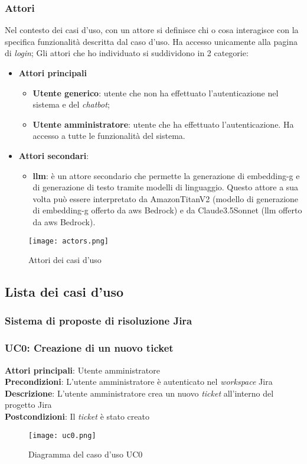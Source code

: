 \subsubsection{Attori}
Nel contesto dei casi d'uso, con un attore si definisce chi o cosa interagisce con la specifica funzionalità descritta dal caso d'uso. Ha accesso unicamente alla pagina di \textit{login}; 
Gli attori che ho individuato si suddividono in 2 categorie:
\begin{itemize}
    \item \textbf{Attori principali} \begin{itemize} \item \textbf{Utente generico}: utente che non ha effettuato l'autenticazione nel sistema e del \textit{chatbot}; \item \textbf{Utente amministratore}: utente che ha effettuato l'autenticazione. Ha accesso a tutte le funzionalità del sistema.
    \end{itemize}
    \item \textbf{Attori secondari}: \begin{itemize} \item \textbf{\gls{llm}}: è un attore secondario che permette la generazione di \gls{embedding-g} e di generazione di testo tramite modelli di linguaggio. Questo attore a sua volta può essere interpretato da AmazonTitanV2 (modello di generazione di \gls{embedding-g} offerto da \gls{aws} Bedrock) e da Claude3.5Sonnet (\gls{llm} offerto da \gls{aws} Bedrock).
    \end{itemize}
\end{itemize}
\begin{figure}[H]
    \centering
    \texttt{[image: actors.png]}
    \caption{Attori dei casi d'uso}
    \label{fig:attori}
\end{figure}
\subsection*{Lista dei casi d'uso}
\subsubsection{Sistema di proposte di risoluzione Jira}
\subsubsection{UC0: Creazione di un nuovo ticket}
\textbf{Attori principali}: Utente amministratore \\
\textbf{Precondizioni}: L'utente amministratore è autenticato nel \textit{workspace} Jira\\
\textbf{Descrizione}: L'utente amministratore crea un nuovo \textit{ticket} all'interno del progetto Jira \\
\textbf{Postcondizioni}: Il \textit{ticket} è stato creato \\
\begin{figure}[H]
    \centering
    \texttt{[image: uc0.png]}
    \caption{Diagramma del caso d'uso UC0}
    \label{fig:UC0}
\end{figure}
